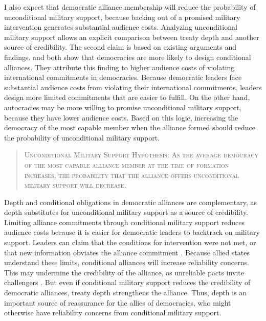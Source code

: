 \documentclass[12pt]{article}
\begin{document}
I also expect that democratic alliance membership will reduce the probability of unconditional military support, because backing out of a promised military intervention generates substantial audience costs. 
Analyzing unconditional military support allows an explicit comparison between treaty depth and another source of credibility. 
The second claim is based on existing arguments and findings. 
\citet{Mattes2012} and \citet{Chibaetal2015} both show that democracies are more likely to design conditional alliances. 
They attribute this finding to higher audience costs of violating international commitments in democracies. 
Because democratic leaders face substantial audience costs from violating their international commitments, leaders design more limited commitments that are easier to fulfill. 
On the other hand, autocracies may be more willing to promise unconditional military support, because they have lower audience costs. 
Based on this logic, increasing the democracy of the most capable member when the alliance formed should reduce the probability of unconditional military support.


\begin{quote}
\textsc{Unconditional Military Support Hypothesis: As the average democracy of the most capable alliance member at the time of formation increases, the probability that the alliance offers unconditional military support will decrease.}
\end{quote} 


Depth and conditional obligations in democratic alliances are complementary, as depth substitutes for unconditional military support as a source of credibility. 
Limiting alliance commitments through conditional military support reduces audience costs because it is easier for democratic leaders to backtrack on military support. 
Leaders can claim that the conditions for intervention were not met, or that new information obviates the alliance commitment \citep{LevenduskyHorowitz2012}. 
Because allied states understand these limits, conditional alliances will increase reliability concerns. 
This may undermine the credibility of the alliance, as unreliable pacts invite challengers \citep{Smith1995}. 
But even if conditional military support reduces the credibility of democratic alliances, treaty depth strengthens the alliance. 
Thus, depth is an important source of reassurance for the allies of democracies, who might otherwise have reliability concerns from conditional military support. 
\end{document}
